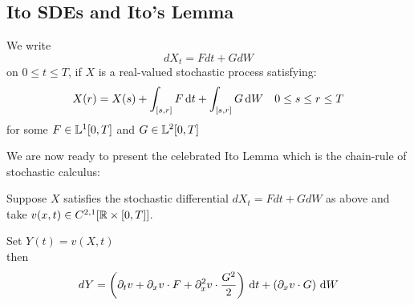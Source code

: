 \subsection{Ito SDEs and Ito's Lemma}
\begin{defn}

We write
\begin{equation}
dX_t = F dt + G dW
\end{equation}
on $0 \leq t \leq T$, if $X$ is a real-valued stochastic process satisfying:
\begin{equation*}
X(r) = X(s) + \int_{[s,r]} F \, \mathrm{d} t + \int_{[s,r]} G \, \mathrm{d} W
\quad 0\leq s \leq r \leq T
\end{equation*}
for some $F \in {\mathbb{L}^1}[0,T]$ and $G \in {\mathbb{L}^2}[0,T]$
\end{defn}

We are now ready to present the celebrated Ito Lemma which is the chain-rule of
stochastic calculus:

\begin{thm}

Suppose $X$ satisfies the stochastic differential $dX_t =
Fdt + G dW$ as above and take $v(x,t) \in C^{2,1}[ { \mathbb{R} } \times [0,T]]$.

Set $Y(t) = v(X,t)$
\\
then
$$
dY =  \left( {\partial}_t v + {\partial}_x v \cdot F + {\partial}^2_x v \cdot \frac{G^2}2 \right)
\, \mathrm{d} t + \left(   {\partial}_x v\cdot G  \right)\, \mathrm{d} W
$$
\end{thm}

